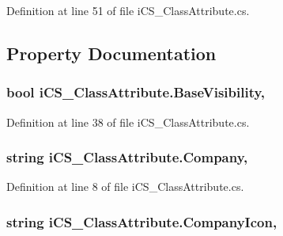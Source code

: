 Definition at line 51 of file i\+C\+S\+\_\+\+Class\+Attribute.\+cs.



\subsection{Property Documentation}
\hypertarget{classi_c_s___class_attribute_a932463ae5be5fc64da7b4cd07c43361e}{
\subsubsection[{Base\+Visibility}]{\setlength{\rightskip}{0pt plus 5cm}bool i\+C\+S\+\_\+\+Class\+Attribute.\+Base\+Visibility\hspace{0.3cm}{\ttfamily [get]}, {\ttfamily [set]}}}\label{classi_c_s___class_attribute_a932463ae5be5fc64da7b4cd07c43361e}


Definition at line 38 of file i\+C\+S\+\_\+\+Class\+Attribute.\+cs.

\hypertarget{classi_c_s___class_attribute_a7a476b32072c96a69ab3600e3e49851a}{
\subsubsection[{Company}]{\setlength{\rightskip}{0pt plus 5cm}string i\+C\+S\+\_\+\+Class\+Attribute.\+Company\hspace{0.3cm}{\ttfamily [get]}, {\ttfamily [set]}}}\label{classi_c_s___class_attribute_a7a476b32072c96a69ab3600e3e49851a}


Definition at line 8 of file i\+C\+S\+\_\+\+Class\+Attribute.\+cs.

\hypertarget{classi_c_s___class_attribute_a7011c8636522809fc3ef32f53baefe83}{
\subsubsection[{Company\+Icon}]{\setlength{\rightskip}{0pt plus 5cm}string i\+C\+S\+\_\+\+Class\+Attribute.\+Company\+Icon\hspace{0.3cm}{\ttfamily [get]}, {\ttfamily [set]}}}\label{classi_c_s___class_attribute_a7011c8636522809fc3ef32f53baefe83}


